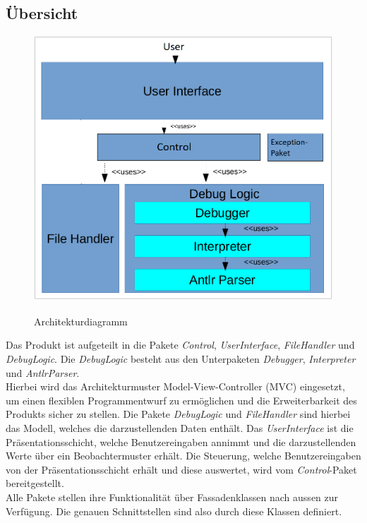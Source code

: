 ﻿\documentclass[parskip=full]{scrartcl}
\begin{document}
\subsection{Übersicht}

\begin{figure}[!h]
\centering
\includegraphics[scale=0.35]{../Plichtenheft/Architektur.png} \\
\caption{Architekturdiagramm}
\end{figure}
Das Produkt ist aufgeteilt in die Pakete \textit{Control}, \textit{UserInterface}, \textit{FileHandler} und \textit{DebugLogic}.
Die \textit{DebugLogic} besteht aus den Unterpaketen \textit{Debugger}, \textit{Interpreter} und
\textit{AntlrParser}.\\
Hierbei wird das Architekturmuster Model-View-Controller (MVC) eingesetzt, um einen flexiblen Programmentwurf zu ermöglichen und die Erweiterbarkeit des Produkts sicher zu stellen. Die Pakete \textit{DebugLogic} und \textit{FileHandler} sind hierbei das Modell, welches die darzustellenden Daten enthält. Das \textit{UserInterface} ist die Präsentationsschicht, welche Benutzereingaben annimmt und die darzustellenden Werte über ein Beobachtermuster erhält. Die Steuerung, welche Benutzereingaben von der Präsentationsschicht erhält und diese auswertet, wird vom \textit{Control}-Paket bereitgestellt. \\
Alle Pakete stellen ihre Funktionalität über Fassadenklassen nach aussen zur Verfügung. Die genauen Schnittstellen sind also durch diese Klassen definiert.
\end{document}
